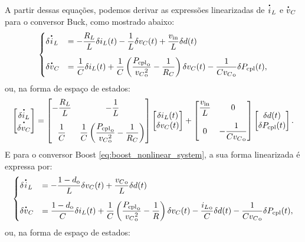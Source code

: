A partir dessas equações, podemos derivar as expressões linearizadas de $\dt{i}_L$ e $\dt{v}_C$ para o conversor Buck, como mostrado abaixo: \begin{equation} \begin{cases} \delta \dt{i}_L &= \displaystyle -\frac{R_L}{L} \delta i_L(t) - \frac{1}{L} \delta v_C(t) + \frac{v_{\mathrm{in}}}{L} \delta d(t) \\[12pt] \delta \dt{v}_C &= \displaystyle \frac{1}{C} \delta i_L(t) + \frac{1}{C} \left(\frac{{P_{\mathrm{cpl}}}_{\mathrm{o}}}{{v_C}^2_{\mathrm{o}}} - \frac{1}{R_C}\right) \delta v_C(t) - \frac{1}{C{v_C}_{\mathrm{o}}} \delta P_{\mathrm{cpl}}(t), \end{cases} \end{equation} ou, na forma de espaço de estados: \begin{equation} \begin{bmatrix} \dt{\delta i_L} \\ \dt{\delta v_C} \end{bmatrix} = \begin{bmatrix} \displaystyle -\frac{R_L}{L} & \displaystyle -\frac{1}{L}  \\[12pt] \displaystyle \frac{1}{C} & \displaystyle \frac{1}{C}\left(\frac{{P_{\mathrm{cpl}}}_{\mathrm{o}}}{{{v_{C}}^2_{\mathrm{o}}}} - \frac{1}{R_C}\right) \end{bmatrix} \begin{bmatrix} \delta i_L(t) \\ \delta v_C(t) \end{bmatrix} + \begin{bmatrix} {\displaystyle \frac{v_{\mathrm{in}}}{L}} & 0 \\[12pt] 0 & \displaystyle {-\frac{1}{C{v_C}_{\mathrm{o}}}} \end{bmatrix}  \begin{bmatrix} \delta d(t) \\ \delta P_{\mathrm{cpl}}(t) \end{bmatrix}. \label{eq:buck_linear_system}\end{equation} E para o conversor Boost \eqref{eq:boost_nonlinear_system}, a sua forma linearizada é expressa por: \begin{equation} \begin{cases} \delta \dt{i}_L &= \displaystyle - \frac{1 - d_{\mathrm{o}}}{L} \delta v_C(t) + \frac{{v_C}_{\mathrm{o}}}{L}\delta d(t) \\[12pt] \delta \dt{v}_C &= \displaystyle \frac{1 - d_{\mathrm{o}}}{C} \delta i_L(t) + \frac{1}{C} \left(\frac{{P_{\mathrm{cpl}}}_{\mathrm{o}}}{{v_C}^2_{\mathrm{o}}} - \frac{1}{R}\right) \delta v_C(t) - \frac{{i_L}_{\mathrm{o}}}{C} \delta d(t) - \frac{1}{C{v_C}_{\mathrm{o}}} \delta P_{\mathrm{cpl}}(t), \end{cases} \end{equation} ou, na forma de espaço de estados: \begin{equation} 

\end{equation}

